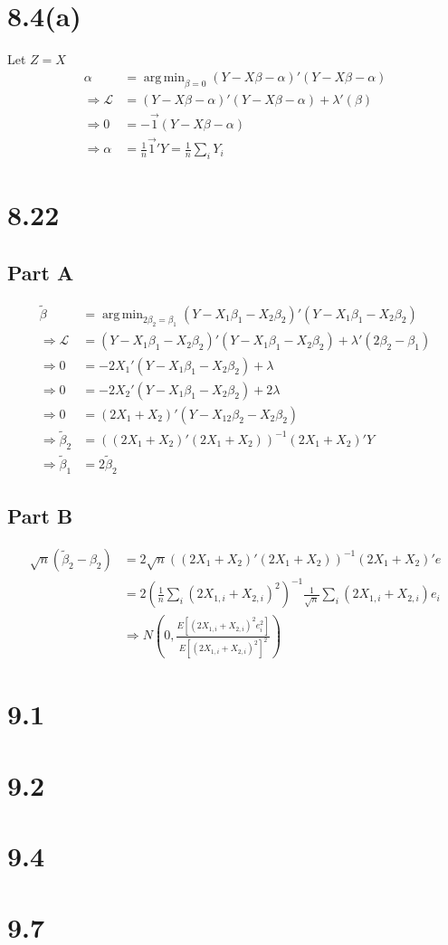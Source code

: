 \documentclass[11pt]{article} %
\DeclareMathOperator*{\argmin}{arg\,min}
\begin{document}
\section{8.4(a)}
Let $Z = X$
\begin{align*}
\alpha &= \argmin_{\beta = 0} (Y-X\beta - \alpha)'(Y-X\beta - \alpha)\\
\Rightarrow \mathcal{L} &=  (Y-X\beta - \alpha)'(Y-X\beta - \alpha) + \lambda'(\beta)\\
\Rightarrow 0&=-\vec{1}(Y-X\beta - \alpha) \\
\Rightarrow \alpha &= \frac{1}{n}\vec{1}'Y = \frac{1}{n}\sum_iY_i
\end{align*}
\section{8.22}
\subsection{Part A}
\begin{align*}
\tilde{\beta} &= \argmin_{2\beta_2 = \beta_1}  (Y-X_1\beta_1 -X_2\beta_2)'(Y-X_1\beta_1 -X_2\beta_2)\\
\Rightarrow \mathcal{L} &= (Y-X_1\beta_1 -X_2\beta_2)'(Y-X_1\beta_1 -X_2\beta_2) + \lambda'(2\beta_2 - \beta_1)\\
\Rightarrow 0&= -2X_1'(Y-X_1\beta_1 - X_2 \beta_2)+\lambda\\
\Rightarrow 0&= -2X_2'(Y-X_1\beta_1 - X_2 \beta_2)+2\lambda\\
\Rightarrow 0&= (2X_1 + X_2)'(Y-X_12\beta_2 - X_2 \beta_2)\\
\Rightarrow \tilde{\beta}_2&= ((2X_1 +X_2)'(2X_1 +X_2))^{-1}(2X_1 +X_2)'Y\\
\Rightarrow \tilde{\beta}_1&= 2\tilde{\beta}_2
\end{align*}
\subsection{Part B}
\begin{align*}
\sqrt{n}(\tilde{\beta}_2 - \beta_2) &= 2\sqrt{n}((2X_1 +X_2)'(2X_1 +X_2))^{-1}(2X_1 +X_2)'e\\
&=2 (\frac{1}{n}\sum_i (2X_{1,i} +X_{2,i})^{2})^{-1} \frac{1}{\sqrt{n}}\sum_i (2X_{1,i} +X_{2,i})e_i\\
&\Rightarrow N\left(0,\frac{E[ (2X_{1,i} +X_{2,i})^2e_i^2]}{E[(2X_{1,i} +X_{2,i})^{2}]^2} \right)
\end{align*}
\section{9.1}

\section{9.2}

\section{9.4}

\section{9.7}
\end{document}
